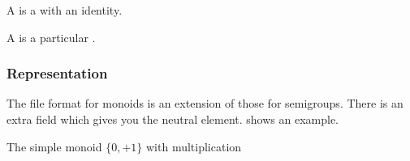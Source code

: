 
A \Monoid is a \Semigroup with an identity.


A \FiniteMonoid is a particular \FiniteSemigroup.


\subsubsection*{Representation}

The file format for monoids is an extension of those for semigroups.
There is an extra field  which gives you the neutral element.
 shows an example.

\begin{marginfigure}%
	\caption{The simple monoid $\{0,+1\}$ with multiplication}%
	\label{fig:monoid2}%
\end{marginfigure}%



